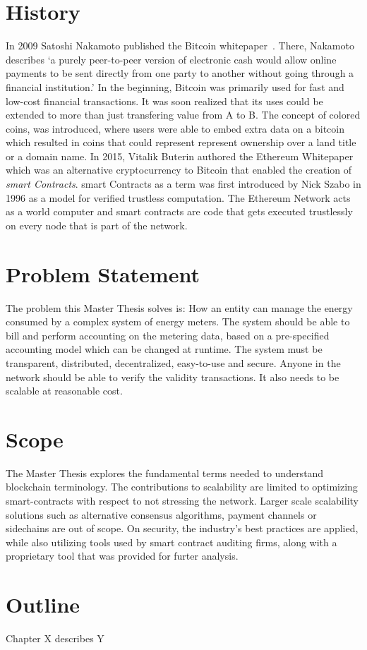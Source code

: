 \section{History}
In 2009 Satoshi Nakamoto published the Bitcoin whitepaper~\cite{bitcoin}. There, Nakamoto describes `a purely peer-to-peer version of electronic cash would allow online payments to be sent directly from one party to another without going through a financial institution.'
In the beginning, Bitcoin was primarily used for fast and low-cost financial transactions. It was soon realized that its uses could be extended to more than just transfering value from A to B. The concept of colored coins, \cite{colored} was introduced, where users were able to embed extra data on a bitcoin which resulted in coins that could represent represent ownership over a land title or a domain name. In 2015, Vitalik Buterin authored the Ethereum Whitepaper \cite{vitalik} which was an alternative cryptocurrency to Bitcoin that enabled the creation of \textit{smart Contracts}. smart Contracts as a term was first introduced by Nick Szabo in 1996 \cite{szabo} as a model for verified trustless computation. The Ethereum Network acts as a world computer and smart contracts are code that gets executed trustlessly on every node that is part of the network. 

\section{Problem Statement}
The problem this Master Thesis solves is:
How an entity can manage the energy consumed by a complex system of energy meters.
The  system should be able to bill and perform accounting on the metering data, based on a pre-specified accounting model which can be changed at runtime.
The system must be transparent, distributed, decentralized, easy-to-use and secure.
Anyone in the network should be able to verify the validity transactions.
It also needs to be scalable at reasonable cost.

\section{Scope}
The Master Thesis explores the fundamental terms needed to understand blockchain terminology. The contributions to scalability are limited to optimizing smart-contracts with respect to not stressing the network. Larger scale scalability solutions such as alternative consensus algorithms, payment channels or sidechains are out of scope. On security, the industry's best practices are applied, while also utilizing tools used by smart contract auditing firms, along with a proprietary tool that was provided for furter analysis.

\section{Outline}
Chapter X describes Y